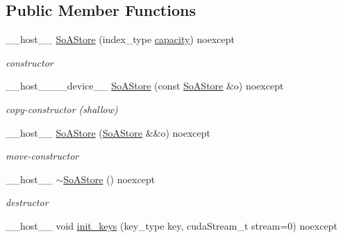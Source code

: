 \subsection*{Public Member Functions}
\begin{DoxyCompactItemize}
\item 
\+\_\+\+\_\+host\+\_\+\+\_\+ \hyperlink{classwarpcore_1_1storage_1_1key__value_1_1SoAStore_ada33178712cdc4a96ff1dee1b3a9e624}{So\+A\+Store} (index\+\_\+type \hyperlink{classwarpcore_1_1storage_1_1key__value_1_1SoAStore_a2ae1c90988d891741861e6e6d571ec00}{capacity}) noexcept
\begin{DoxyCompactList}\small\item\em constructor \end{DoxyCompactList}\item 
\+\_\+\+\_\+host\+\_\+\+\_\+\+\_\+\+\_\+device\+\_\+\+\_\+ \hyperlink{classwarpcore_1_1storage_1_1key__value_1_1SoAStore_afa42ed6e282fadc26ebbc583617978f4}{So\+A\+Store} (const \hyperlink{classwarpcore_1_1storage_1_1key__value_1_1SoAStore}{So\+A\+Store} \&o) noexcept
\begin{DoxyCompactList}\small\item\em copy-\/constructor (shallow) \end{DoxyCompactList}\item 
\+\_\+\+\_\+host\+\_\+\+\_\+ \hyperlink{classwarpcore_1_1storage_1_1key__value_1_1SoAStore_a6a81007ef10db9fce8c75e3781a50ee3}{So\+A\+Store} (\hyperlink{classwarpcore_1_1storage_1_1key__value_1_1SoAStore}{So\+A\+Store} \&\&o) noexcept
\begin{DoxyCompactList}\small\item\em move-\/constructor \end{DoxyCompactList}\item 
\mbox{\label{classwarpcore_1_1storage_1_1key__value_1_1SoAStore_ae55577a94a59de733f3d377024beeb92}} 
\+\_\+\+\_\+host\+\_\+\+\_\+ \hyperlink{classwarpcore_1_1storage_1_1key__value_1_1SoAStore_ae55577a94a59de733f3d377024beeb92}{$\sim$\+So\+A\+Store} () noexcept
\begin{DoxyCompactList}\small\item\em destructor \end{DoxyCompactList}\item 
\+\_\+\+\_\+host\+\_\+\+\_\+ void \hyperlink{classwarpcore_1_1storage_1_1key__value_1_1SoAStore_a4e2cbadf289a8f38bf81aa7e01190f9f}{init\+\_\+keys} (key\+\_\+type key, cuda\+Stream\+\_\+t stream=0) noexcept

\end{DoxyCompactItemize}
